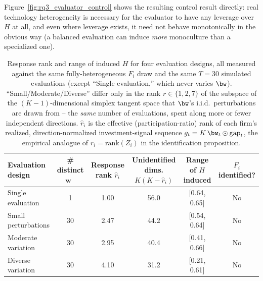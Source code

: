 Figure~\ref{fig:rq3_evaluator_control} shows the resulting control result directly: real technology heterogeneity is necessary for the evaluator to have any leverage over $H$ at all, and even where leverage exists, it need not behave monotonically in the obvious way (a balanced evaluation can induce \emph{more} monoculture than a specialized one).

\begin{table}
\caption{Response rank and range of induced $H$ for four evaluation designs, all measured against the same fully-heterogeneous $F_i$ draw and the same $T=30$ simulated evaluations (except ``Single evaluation,'' which never varies $\bw$). ``Small/Moderate/Diverse'' differ only in the rank $r\in\{1,2,7\}$ of the subspace of the $(K-1)$-dimensional simplex tangent space that $\bw$'s i.i.d.\ perturbations are drawn from -- the \emph{same} number of evaluations, spent along more or fewer independent directions. $\hat r_i$ is the effective (participation-ratio) rank of each firm's realized, direction-normalized investment-signal sequence $g_t=K\,\bw_t\odot\mathrm{gap}_t$, the empirical analogue of $r_i=\mathrm{rank}(Z_i)$ in the identification proposition.}
\label{tab:semi_synthetic}
    \begin{tabular}{lccccc}
\toprule
Evaluation design & \# distinct $\mathbf{w}$\ & Response rank $\hat r_i$ & Unidentified dims. $K(K-\hat r_i)$ & Range of $H$ induced & $F_i$ identified? \\
\midrule
Single evaluation & 1 & 1.00 & 56.0 & [0.64, 0.65] & No \\
Small perturbations & 30 & 2.47 & 44.2 & [0.54, 0.64] & No \\
Moderate variation & 30 & 2.95 & 40.4 & [0.41, 0.66] & No \\
Diverse variation & 30 & 4.10 & 31.2 & [0.21, 0.61] & No \\
\bottomrule
\end{tabular}
\end{table}

